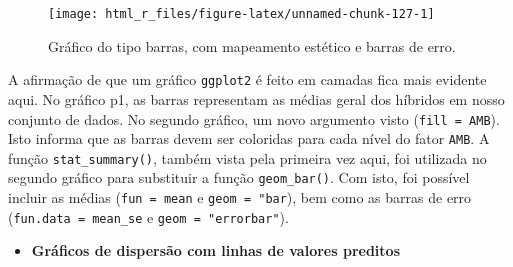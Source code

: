 \documentclass[
]{book}
\providecommand{\tightlist}{%
  \setlength{\itemsep}{0pt}\setlength{\parskip}{0pt}}
\begin{document}
\begin{figure}

{\centering \texttt{[image: html\_r\_files/figure-latex/unnamed-chunk-127-1]} 

}

\caption{Gráfico do tipo barras, com mapeamento estético e barras de erro.}\label{fig:unnamed-chunk-127}
\end{figure}


A afirmação de que um gráfico \texttt{ggplot2} é feito em camadas fica mais evidente aqui. No gráfico p1, as barras representam as médias geral dos híbridos em nosso conjunto de dados. No segundo gráfico, um novo argumento visto (\texttt{fill\ =\ AMB}). Isto informa que as barras devem ser coloridas para cada nível do fator \texttt{AMB}. A função \texttt{stat\_summary()},  também vista pela primeira vez aqui, foi utilizada no segundo gráfico para substituir a função \texttt{geom\_bar()}. Com isto, foi possível incluir as médias (\texttt{fun\ =\ mean} e \texttt{geom\ =\ "bar}), bem como as barras de erro (\texttt{fun.data\ =\ mean\_se} e \texttt{geom\ =\ "errorbar"}). 

\begin{itemize}
\tightlist
\item
  \textbf{Gráficos de dispersão com linhas de valores preditos}
\end{itemize}
\end{document}
